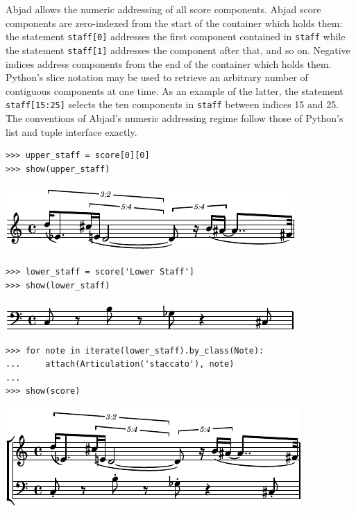 \documentclass{article}
\begin{document}
\hrulefill\vspace{5pt}

Abjad allows the numeric addressing of all score components. Abjad score
components are zero-indexed from the start of the container which holds them:
the statement \texttt{staff[0]} addresses the first component contained in
\texttt{staff} while the statement \texttt{staff[1]} addresses the component
after that, and so on. Negative indices address components from the end of the
container which holds them. Python's slice notation may be used to retrieve an
arbitrary number of contiguous components at one time. As an example of the
latter, the statement \texttt{staff[15:25]} selects the ten components in
\texttt{staff} between indices 15 and 25. The conventions of Abjad's numeric
addressing regime follow those of Python's list and tuple interface exactly. 

\begin{lstlisting}
>>> upper_staff = score[0][0]
>>> show(upper_staff)
\end{lstlisting}

\includegraphics[scale=1.0]{images/abjad-3.pdf}


\begin{lstlisting}
>>> lower_staff = score['Lower Staff']
>>> show(lower_staff)
\end{lstlisting}

\includegraphics[scale=1.0]{images/abjad-4.pdf}


\begin{lstlisting}
>>> for note in iterate(lower_staff).by_class(Note):
...     attach(Articulation('staccato'), note)
... 
>>> show(score)
\end{lstlisting}

\includegraphics[scale=1.0]{images/abjad-5.pdf}
\end{document}
